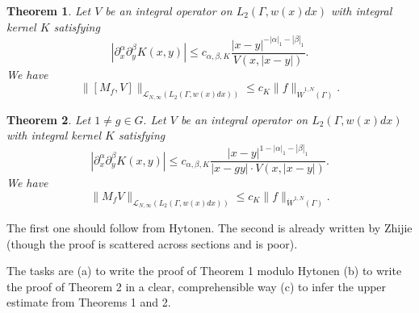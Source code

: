 \documentclass{amsart}
\newtheorem{thm}{Theorem}
\begin{document}
\begin{thm} Let $V$ be an integral operator on $L_2(\Gamma,w(x)dx)$ with integral kernel $K$ satisfying 
$$|\partial^{\alpha}_x\partial^{\beta}_yK(x,y)|\leq c_{\alpha,\beta,K}\frac{|x-y|^{-|\alpha|_1-|\beta|_1}}{V(x,|x-y|)}.$$
We have
$$\|[M_f,V]\|_{\mathcal{L}_{N,\infty}(L_2(\Gamma,w(x)dx))}\leq c_K\|f\|_{\dot{W}^{1,N}(\Gamma)}.$$
\end{thm}

\begin{thm} Let $1\neq g\in G.$ Let $V$ be an integral operator on $L_2(\Gamma,w(x)dx)$ with integral kernel $K$ satisfying 
$$|\partial^{\alpha}_x\partial^{\beta}_yK(x,y)|\leq c_{\alpha,\beta,K}\frac{|x-y|^{1-|\alpha|_1-|\beta|_1}}{|x-gy|\cdot V(x,|x-y|)}.$$
We have
$$\|M_fV\|_{\mathcal{L}_{N,\infty}(L_2(\Gamma,w(x)dx))}\leq c_K\|f\|_{\dot{W}^{1,N}(\Gamma)}.$$
\end{thm}

The first one should follow from Hytonen. The second is already written by Zhijie (though the proof is scattered across sections and is poor).

The tasks are (a) to write the proof of Theorem 1 modulo Hytonen (b) to write the proof of Theorem 2 in a clear, comprehensible way (c) to infer the upper estimate from Theorems 1 and 2.
\end{document}
